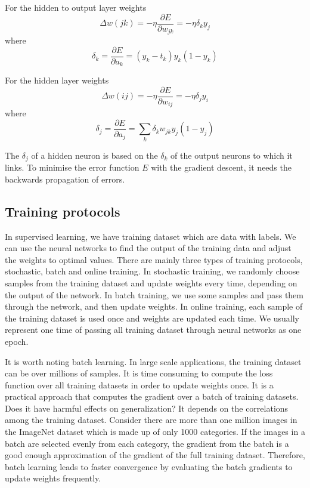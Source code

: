 For the hidden to output layer weights
\begin{equation}\label{eq:h2oBP}
\Delta w(jk) = -\eta \frac{\partial E}{\partial w_{jk}} = -\eta \delta_{k}y_{j}
\end{equation}
where $$\delta_{k} = \frac{\partial E}{\partial a_{k}} = (y_{k} - t_{k})y_{k}(1 - y_{k})$$

For the hidden layer weights
\begin{equation}\label{eq:hiddenBP}
\Delta w(ij) = -\eta \frac{\partial E}{\partial w_{ij}} = -\eta \delta_{j}y_{i}
\end{equation}
where $$\delta_{j} = \frac{\partial E}{\partial a_{j}} = \displaystyle\sum_{k} \delta_{k}w_{jk}y_{j}(1 - y_{j})$$

The $\delta_{j}$ of a hidden neuron is based on the $\delta_{k}$ of the output neurons to which it links. To minimise the error function $E$ with the gradient descent, it needs the backwards propagation of errors.

\subsection{Training protocols}

In supervised learning, we have training dataset which are data with labels. We can use the neural networks to find the output of the training data and adjust the weights to optimal values. There are mainly  three types of training protocols, stochastic, batch and online training. In stochastic training, we randomly choose samples from the training dataset and update weights every time, depending on the output of the network. In batch training, we use some samples and pass them through the network, and then update weights. In online training, each sample of the training dataset is used once and weights are updated each time. We usually represent one time of passing all training dataset through neural networks as one epoch.

It is worth noting batch learning. In large scale applications, the training dataset can be over millions of samples. It is time consuming to compute the loss function over all training datasets in order to update weights once. It is a practical approach that computes the gradient over a batch of training datasets. Does it have harmful effects on generalization? It depends on the correlations among the training dataset. Consider there are more than one million images in the ImageNet dataset which is made up of only 1000 categories. If the images in a batch are selected evenly from each category, the gradient from the batch is a good enough approximation of the gradient of the full training dataset. Therefore, batch learning leads to faster convergence by evaluating the batch gradients to update weights frequently.

